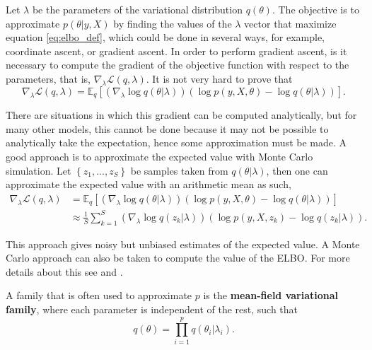 Let $\lambda$ be the parameters of the variational distribution $q(\theta)$. The objective is to approximate $p(\theta | y, X)$ by finding the values of the $\lambda$ vector that maximize equation \ref{eq:elbo_def}, which could be done in several ways, for example, coordinate ascent, or gradient ascent. In order to perform gradient ascent, is it necessary to compute the gradient of the objective function with respect to the parameters, that is, $\nabla_{\lambda} \mathcal{L}(q, \lambda)$. It is not very hard to prove that
\begin{equation}
  \label{eq:ELBO_gradient}
  \nabla_{\lambda} \mathcal{L}(q, \lambda) =
  \mathbb{E}_q \left[ \left( \nabla_{\lambda} \log q(\theta | \lambda) \right) \left( \log p(y, X, \theta) - \log q(\theta | \lambda) \right) \right].
\end{equation}

There are situations in which this gradient can be computed analytically, but for many other models, this cannot be done because it may not be possible to analytically take the expectation, hence some approximation must be made. A good approach is to approximate the expected value with Monte Carlo simulation. Let $\left\{ z_1, ..., z_S \right\}$ be samples taken from $q(\theta | \lambda)$, then one can approximate the expected value with an arithmetic mean as such,
\begin{equation}
  \begin{split}
  \nabla_{\lambda} \mathcal{L}(q, \lambda) &=
  \mathbb{E}_q \left[ \left( \nabla_{\lambda} \log q(\theta | \lambda) \right) \left( \log p(y, X, \theta) - \log q(\theta | \lambda) \right) \right] \\
  & \approx \frac{1}{S} \sum_{k = 1}^S \left( \nabla_{\lambda} \log q(z_k | \lambda) \right) \left( \log p(y, X, z_k) - \log q(z_k | \lambda) \right).
  \end{split}
\end{equation}

This approach gives noisy but unbiased estimates of the expected value. A Monte Carlo approach can also be taken to compute the value of the ELBO. For more details about this see \cite{kucukelbir2017automatic} and \cite{ranganath2014black}.

A family that is often used to approximate $p$ is the \textbf{mean-field variational family}, where each parameter is independent of the rest, such that
\begin{equation}
  q(\theta) = \prod_{i = 1}^p q(\theta_i | \lambda_i).
\end{equation}

